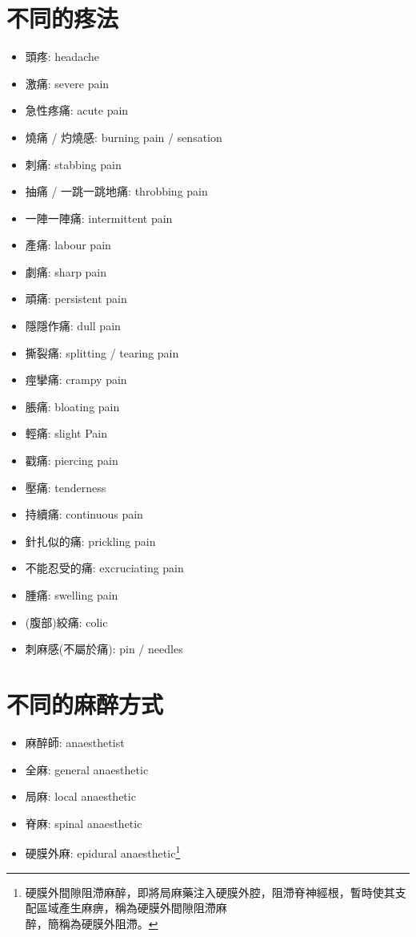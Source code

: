 \section{不同的疼法}
\begin{multicols}{3}
\begin{itemize}
  \itemsep0em
  \item 頭疼: headache
  \item 激痛: severe pain
  \item 急性疼痛: acute pain
  \item 燒痛 / 灼燒感: burning pain / sensation
  \item 刺痛: stabbing pain
  \item 抽痛 / 一跳一跳地痛: throbbing pain
  \item 一陣一陣痛: intermittent pain
  \item 產痛: labour pain
  \item 劇痛: sharp pain
  \item 頑痛: persistent pain
  \item 隱隱作痛: dull pain
  \item 撕裂痛: splitting / tearing pain
  \item 痙攣痛: crampy pain
  \item 脹痛: bloating pain
  \item 輕痛: slight Pain
  \item 戳痛: piercing pain
  \item 壓痛: tenderness
  \item 持續痛: continuous pain
  \item 針扎似的痛: prickling pain
  \item 不能忍受的痛: excruciating pain
  \item 腫痛: swelling pain
  \item (腹部)絞痛: colic
  \item 刺麻感(不屬於痛): pin / needles
\end{itemize}
\end{multicols}

\section{不同的麻醉方式}
\begin{multicols}{2}
\begin{itemize}
  \itemsep0em
  \item 麻醉師: anaesthetist
  \item 全麻: general anaesthetic
  \item 局麻: local anaesthetic
  \item 脊麻: spinal anaesthetic
  \item 硬膜外麻: epidural anaesthetic\footnote{硬膜外間隙阻滯麻醉，即將局麻藥注入硬膜外腔，阻滯脊神經根，暫時使其支配區域產生麻痹，稱為硬膜外間隙阻滯麻\\醉，簡稱為硬膜外阻滯。}
\end{itemize}
\end{multicols}

